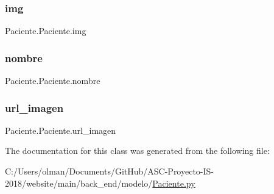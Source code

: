 \subsubsection{\texorpdfstring{img}{img}}
{\footnotesize\ttfamily Paciente.\+Paciente.\+img}

\mbox{\label{class_paciente_1_1_paciente_a0df4d67d7a1e91c7cc72b14ca7bd7b78}} 
\subsubsection{\texorpdfstring{nombre}{nombre}}
{\footnotesize\ttfamily Paciente.\+Paciente.\+nombre}

\mbox{\label{class_paciente_1_1_paciente_a5af3b0cc2e0a1469d603f2efea44df45}} 
\subsubsection{\texorpdfstring{url\+\_\+imagen}{url\_imagen}}
{\footnotesize\ttfamily Paciente.\+Paciente.\+url\+\_\+imagen}



The documentation for this class was generated from the following file\+:\begin{DoxyCompactItemize}
\item 
C\+:/\+Users/olman/\+Documents/\+Git\+Hub/\+A\+S\+C-\/\+Proyecto-\/\+I\+S-\/2018/website/main/back\+\_\+end/modelo/\mbox{\hyperlink{_paciente_8py}{Paciente.\+py}}\end{DoxyCompactItemize}
